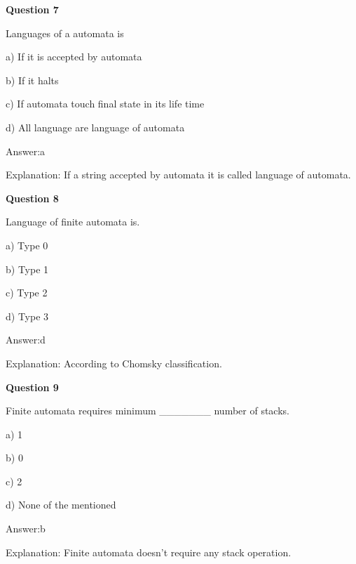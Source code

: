 \documentclass{article}
\begin{document}
\begin{mdframed}[linewidth=1pt, roundcorner=5pt, linecolor=gray!30, backgroundcolor=gray!5]
\textbf{Question 7} 

Languages of a automata is

a) If it is accepted by automata

b) If it halts

c) If automata touch final state in its life time

d) All language are language of automata
\vspace{5pt} \par
\begin{tcolorbox}[colback=green!5, colframe=green!40!black, title=Solution]
Answer:a

Explanation: If a string accepted by automata it is called language of automata.
\end{tcolorbox}
\end{mdframed}

\begin{mdframed}[linewidth=1pt, roundcorner=5pt, linecolor=gray!30, backgroundcolor=gray!5]
\textbf{Question 8} 

Language of finite automata is.

a) Type 0

b) Type 1

c) Type 2

d) Type 3
\vspace{5pt} \par
\begin{tcolorbox}[colback=green!5, colframe=green!40!black, title=Solution]
Answer:d

Explanation: According to Chomsky classification.
\end{tcolorbox}
\end{mdframed}

\begin{mdframed}[linewidth=1pt, roundcorner=5pt, linecolor=gray!30, backgroundcolor=gray!5]
\textbf{Question 9} 

Finite automata requires minimum \_\_\_\_\_\_\_ number of stacks.

a) 1

b) 0

c) 2

d) None of the mentioned
\vspace{5pt} \par
\begin{tcolorbox}[colback=green!5, colframe=green!40!black, title=Solution]
Answer:b

Explanation: Finite automata doesn't require any stack operation.
\end{tcolorbox}
\end{mdframed}
\newpage
\end{document}

